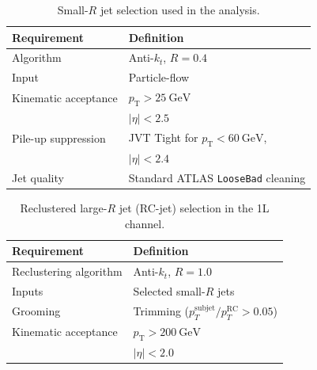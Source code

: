\begin{table}[ht]
  \caption{Small-$R$ jet selection used in the analysis.}
  \label{tab:object:jet}
  \centering
  \begin{tabular}{ll}
    \toprule
    Requirement & Definition \\
    \midrule
    Algorithm & Anti-$k_t$, $R=0.4$ \\
    Input & Particle-flow \\
    \midrule
    Kinematic acceptance &
    $p_{\mathrm{T}} > 25~\mathrm{GeV}$ \\
    &
    $|\eta| < 2.5$ \\
    \midrule
    Pile-up suppression &
    JVT Tight for $p_{\mathrm{T}} < 60~\mathrm{GeV}$, \\
    &
    $|\eta| < 2.4$ \\
    \midrule
    Jet quality & Standard ATLAS \texttt{LooseBad} cleaning \\
    \bottomrule
  \end{tabular}
\end{table}

\begin{table}[ht]
  \caption{Reclustered large-$R$ jet (RC-jet) selection in the 1L channel.}
  \label{tab:object:rcjet}
  \centering
  \begin{tabular}{ll}
    \toprule
    Requirement & Definition \\
    \midrule
    Reclustering algorithm & Anti-$k_t$, $R=1.0$ \\
    Inputs & Selected small-$R$ jets \\
    \midrule
    Grooming & Trimming ($p_T^{\mathrm{subjet}}/p_T^{\mathrm{RC}} > 0.05$) \\
    \midrule
    Kinematic acceptance &
    $p_{\mathrm{T}} > 200~\mathrm{GeV}$ \\
    &
    $|\eta| < 2.0$ \\
    \bottomrule
  \end{tabular}
\end{table}


